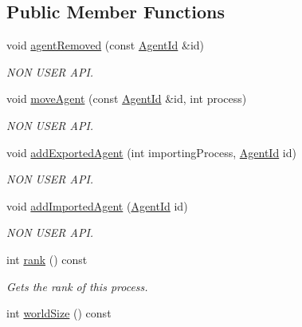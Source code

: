 \subsection*{Public Member Functions}
\begin{DoxyCompactItemize}
\item 
void \hyperlink{classrepast_1_1_repast_process_a20f9086d8f764dea44ddefd157279263}{agent\-Removed} (const \hyperlink{classrepast_1_1_agent_id}{Agent\-Id} \&id)
\begin{DoxyCompactList}\small\item\em N\-O\-N U\-S\-E\-R A\-P\-I. \end{DoxyCompactList}\item 
void \hyperlink{classrepast_1_1_repast_process_a87cced37db3a1810fa4a4beed5c83998}{move\-Agent} (const \hyperlink{classrepast_1_1_agent_id}{Agent\-Id} \&id, int process)
\begin{DoxyCompactList}\small\item\em N\-O\-N U\-S\-E\-R A\-P\-I. \end{DoxyCompactList}\item 
void \hyperlink{classrepast_1_1_repast_process_ab155561fac49d5c7c21a14d385010321}{add\-Exported\-Agent} (int importing\-Process, \hyperlink{classrepast_1_1_agent_id}{Agent\-Id} id)
\begin{DoxyCompactList}\small\item\em N\-O\-N U\-S\-E\-R A\-P\-I. \end{DoxyCompactList}\item 
void \hyperlink{classrepast_1_1_repast_process_a69b8c957acb0d9df24ea37a7d3755e0e}{add\-Imported\-Agent} (\hyperlink{classrepast_1_1_agent_id}{Agent\-Id} id)
\begin{DoxyCompactList}\small\item\em N\-O\-N U\-S\-E\-R A\-P\-I. \end{DoxyCompactList}\item 
int \hyperlink{classrepast_1_1_repast_process_a13b9bbfd146fd534f71c9b7990bab347}{rank} () const 
\begin{DoxyCompactList}\small\item\em Gets the rank of this process. \end{DoxyCompactList}\item 
\hypertarget{classrepast_1_1_repast_process_a7c2aecbb70e0f589d8c458f64f481939}{int \hyperlink{classrepast_1_1_repast_process_a7c2aecbb70e0f589d8c458f64f481939}{world\-Size} () const }\label{classrepast_1_1_repast_process_a7c2aecbb70e0f589d8c458f64f481939}


\end{DoxyCompactItemize}
